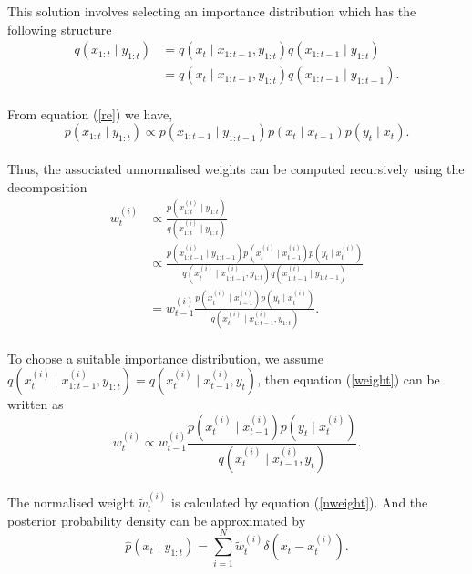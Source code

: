\documentclass[mstat,12pt]{unswthesis}  %
\numberwithin{equation}{section}
\begin{document}
\noindent This solution involves selecting an importance
distribution which has the following structure\\
\begin{equation}\begin{aligned}
q\left( x_{1:t} \mid y_{1:t}  \right)
&=q\left( x_{t} \mid x_{1:t-1},y_{1:t}  \right)q\left( x_{1:t-1} \mid y_{1:t}  \right)\\
&=q\left( x_{t} \mid x_{1:t-1},y_{1:t}  \right)q\left( x_{1:t-1} \mid y_{1:t-1}  \right).
\end{aligned}\end{equation}\\
From equation (\ref{re}) we have,
\begin{equation}
p\left(x_{1:t} \mid y_{1:t}\right)
\propto p\left(x_{1:t-1} \mid y_{1:t-1}\right) p\left(x_{t} \mid x_{t-1}\right) p\left(y_{t} \mid x_{t}\right).
\end{equation}\\
\noindent Thus, the associated unnormalised weights can be computed
recursively using the decomposition
\begin{equation}\label{weight}\begin{aligned}
w_{t}^{(i)} &\propto \frac{ p\left(x_{1:t}^{(i)} \mid y_{1:t}\right)}{q\left(x_{1:t}^{(i)} \mid y_{1:t}\right)} \\
&\propto \frac{p\left(x_{1:t-1}^{(i)} \mid y_{1:t-1}\right) p\left(x_{t}^{(i)} \mid x_{t-1}^{(i)}\right) p\left(y_{t} \mid x_{t}^{(i)}\right)}{q\left( x_{t}^{(i)} \mid x_{1:t-1}^{(i)},y_{1:t}  \right)q\left( x_{1:t-1}^{(i)} \mid y_{1:t-1}  \right)}\\
&=w_{t-1}^{(i)} \frac{ p\left(x_{t}^{(i)} \mid x_{t-1}^{(i)}\right) p\left(y_{t} \mid x_{t}^{(i)}\right)}{q\left( x_{t}^{(i)} \mid x_{1:t-1}^{(i)},y_{1:t}  \right)}.
\end{aligned}\end{equation}\\

\noindent To choose a suitable importance distribution, 
we assume $q\left( x_{t}^{(i)} \mid x_{1:t-1}^{(i)},y_{1:t}  \right)=q\left( x_{t}^{(i)} \mid x_{t-1}^{(i)},y_{t}  \right)$,
then equation (\ref{weight})
can be written as
\begin{equation}
w_{t}^{(i)} \propto
w_{t-1}^{(i)} \frac{ p\left(x_{t}^{(i)} \mid x_{t-1}^{(i)}\right) p\left(y_{t} \mid x_{t}^{(i)}\right)}{q\left( x_{t}^{(i)} \mid x_{t-1}^{(i)},y_{t}  \right)}.
\end{equation}\\
The normalised weight $\widetilde{w}_{t}^{(i)}$ is calculated by equation (\ref{nweight}).
And the posterior  probability  density can be approximated by
\begin{equation}\hat{p}\left(x_{t} \mid y_{1: t}\right) = \sum_{i=1}^{N} \tilde{w}_{t}^{(i)} \delta\left(x_{t}-x_{t}^{(i)}\right).\end{equation}\\
\end{document}
